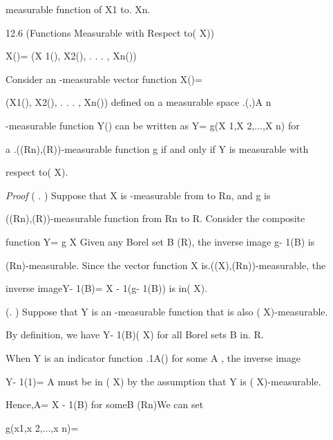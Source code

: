 measurable function of X1 to. Xn.

\begin{thmbox}{12.6 (Functions Measurable with Respect to\sigma( X))}
\end{thmbox}

X()= (X 1(), X2(), . . . , Xn())

Consider an -measurable vector function X()=

(X1(), X2(), . . . , Xn()) defined on a measurable space .(\Omega,)A n

-measurable function Y() can be written as Y= g(X 1,X 2,...,X n) for

a .((Rn),(R))-measurable function g if and only if Y is measurable with

respect to\sigma( X).

\textit{Proof} ( . ) Suppose that X is -measurable from \Omega to Rn, and g is

((Rn),(R))-measurable function from Rn to R. Consider the composite

function Y= g X Given any Borel set B\in {} (R), the inverse image g- 1(B) is

(Rn)-measurable. Since the vector function X is.(\sigma(X),(Rn))-measurable, the

inverse imageY- 1(B)= X - 1(g- 1(B)) is in\sigma( X).

(. ) Suppose that Y is an -measurable function that is also \sigma( X)-measurable.

By definition, we have Y- 1(B)\in \sigma( X) for all Borel sets B in. R.

When Y is an indicator function .1A() for some A\in {} , the inverse image

Y- 1({1})= A must be in \sigma( X) by the assumption that Y is \sigma( X)-measurable.

Hence,A= X - 1(B) for someB\in {} (Rn)We can set

g(x1,x 2,...,x n)=

